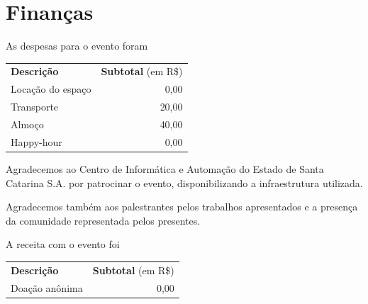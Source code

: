 \documentclass[12pt]{article}
\begin{document}
\newpage

\section*{Finanças}

As despesas para o evento foram

\begin{tabular}{p{}r}
  \textbf{Descrição} & \textbf{Subtotal} (em R\$) \\
  Locação do espaço & 0,00 \\
  Transporte & 20,00 \\ %
  Almoço & 40,00 \\ %
  Happy-hour & 0,00 \\ %
\end{tabular}


Agradecemos ao Centro de Informática e Automação do Estado de Santa Catarina
S.A. por patrocinar o evento, disponibilizando a infraestrutura utilizada.

Agradecemos também aos palestrantes pelos trabalhos apresentados e a presença da comunidade representada pelos presentes.

A receita com o evento foi

\begin{tabular}{p{}r}
  \textbf{Descrição} & \textbf{Subtotal} (em R\$) \\
  Doação anônima & 0,00 \\
\end{tabular}
\end{document}

